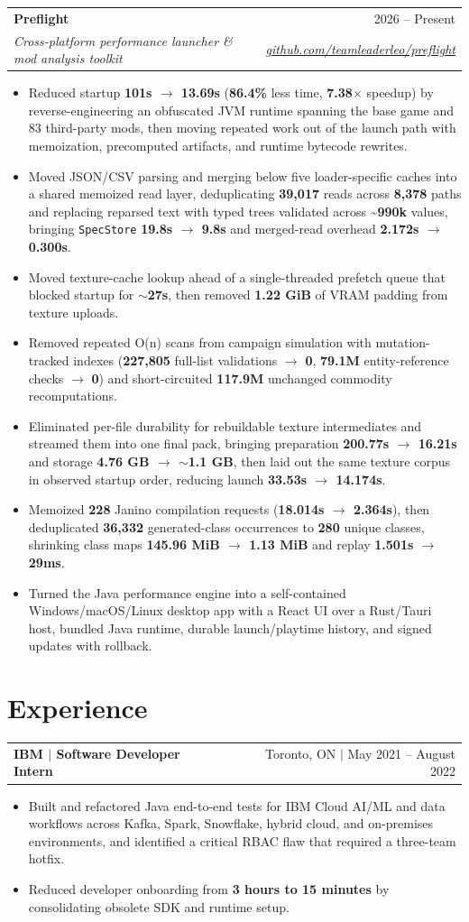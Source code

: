 \documentclass[letterpaper,11pt]{article}
\makeatletter
\newcommand{\resumeHeading}[4]{%
  \begin{tabularx}{\textwidth}{@{}Xr@{}}
    \textbf{#1} & #2 \\
    \textit{\small #3} & \textit{\small #4}
  \end{tabularx}\vspace{-2pt}
}
\newcommand{\resumeHeadingSimple}[2]{%
  \begin{tabularx}{\textwidth}{@{}Xr@{}}
    \textbf{#1} & #2
  \end{tabularx}\vspace{-0.25pt}
}
\newcommand{\resumeItemListStart}{\begin{itemize}[leftmargin=0.23in,itemsep=1.2pt,parsep=0pt,topsep=1.0pt]}
\newcommand{\resumeItem}[1]{\item\fontsize{10.6pt}{12.2pt}\selectfont #1}
\newcommand{\resumeItemListEnd}{\end{itemize}\vspace{-0.25pt}}
\makeatother
\begin{document}
\resumeHeading
  {Preflight}
  {2026 -- Present}
  {\normalfont Cross-platform performance launcher \& mod analysis toolkit}
  {\normalfont \href{https://github.com/teamleaderleo/preflight}{github.com/teamleaderleo/preflight}}
\resumeItemListStart
  \resumeItem{Reduced startup \textbf{101s $\rightarrow$ 13.69s} (\textbf{86.4\%} less time, \textbf{7.38$\times$} speedup) by reverse-engineering an obfuscated JVM runtime spanning the base game and 83 third-party mods, then moving repeated work out of the launch path with memoization, precomputed artifacts, and runtime bytecode rewrites.}
  \resumeItem{Moved JSON/CSV parsing and merging below five loader-specific caches into a shared memoized read layer, deduplicating \textbf{39,017} reads across \textbf{8,378} paths and replacing reparsed text with typed trees validated across \textbf{\textasciitilde990k} values, bringing \texttt{SpecStore} \textbf{19.8s $\rightarrow$ 9.8s} and merged-read overhead \textbf{2.172s $\rightarrow$ 0.300s}.}
  \resumeItem{Moved texture-cache lookup ahead of a single-threaded prefetch queue that blocked startup for \textbf{$\sim$27s}, then removed \textbf{1.22 GiB} of VRAM padding from texture uploads.}
  \resumeItem{Removed repeated O(n) scans from campaign simulation with mutation-tracked indexes (\textbf{227,805} full-list validations $\rightarrow$ \textbf{0}, \textbf{79.1M} entity-reference checks $\rightarrow$ \textbf{0}) and short-circuited \textbf{117.9M} unchanged commodity recomputations.}
  \resumeItem{Eliminated per-file durability for rebuildable texture intermediates and streamed them into one final pack, bringing preparation \textbf{200.77s $\rightarrow$ 16.21s} and storage \textbf{4.76 GB $\rightarrow$ $\sim$1.1 GB}, then laid out the same texture corpus in observed startup order, reducing launch \textbf{33.53s $\rightarrow$ 14.174s}.}
  \resumeItem{Memoized \textbf{228} Janino compilation requests (\textbf{18.014s $\rightarrow$ 2.364s}), then deduplicated \textbf{36,332} generated-class occurrences to \textbf{280} unique classes, shrinking class maps \textbf{145.96 MiB $\rightarrow$ 1.13 MiB} and replay \textbf{1.501s $\rightarrow$ 29ms}.}
  \resumeItem{Turned the Java performance engine into a self-contained Windows/macOS/Linux desktop app with a React UI over a Rust/Tauri host, bundled Java runtime, durable launch/playtime history, and signed updates with rollback.}
\resumeItemListEnd

\section{Experience}
\resumeHeadingSimple
  {IBM $|$ Software Developer Intern}
  {Toronto, ON $|$ May 2021 -- August 2022}
\resumeItemListStart
  \resumeItem{Built and refactored Java end-to-end tests for IBM Cloud AI/ML and data workflows across Kafka, Spark, Snowflake, hybrid cloud, and on-premises environments, and identified a critical RBAC flaw that required a three-team hotfix.}
  \resumeItem{Reduced developer onboarding from \textbf{3 hours to 15 minutes} by consolidating obsolete SDK and runtime setup.}
\resumeItemListEnd
\end{document}
